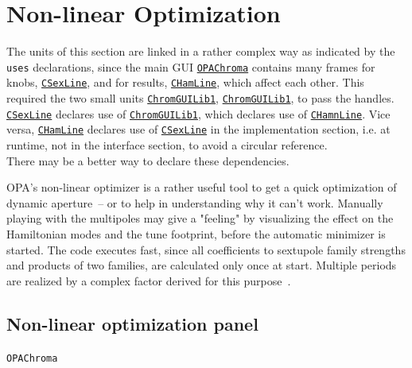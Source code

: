 \documentclass[12pt]{article}
\newcommand\code[1]{{\tt #1}}
\newcommand{\opagui}[1]{\colorbox{blue!20}{\code{#1}}}
\newcommand{\oguih}[2]{\subsection{\label{#2}#1}{\Huge\opagui{#2}}\\}
\newcommand{\ogui}[1]{\hyperref[#1]{\opagui{#1}}}
\newcommand{\opaguif}[1]{\colorbox{violet!30}{\code{#1}}}
\newcommand{\oguif}[1]{\hyperref[#1]{\opaguif{#1}}}
\newcommand{\opauni}[1]{\colorbox{orange!30}{\code{#1}}}
\newcommand{\ouni}[1]{\hyperref[#1]{\opauni{#1}}}
\newcommand{\todo}[1]{{\color{red} #1}}
\newcommand{\feature}[1]{{\color{cadmiumgreen} #1}}
\begin{document}
\section{\label{secnonl}Non-linear Optimization}

The units of this section are linked in a rather complex way as indicated by the \code{uses} declarations, since the main GUI \ogui{OPAChroma} contains many frames for knobs, \oguif{CSexLine}, and for results, \oguif{CHamLine}, which affect each other. This required the two small units \ouni{ChromGUILib1}, \ouni{ChromGUILib1}, to pass the handles. \oguif{CSexLine} declares use of \ouni{ChromGUILib1}, which declares use of \oguif{CHamnLine}. Vice versa,
\oguif{CHamLine} declares use of \oguif{CSexLine} in the implementation section, i.e. at runtime, not in the interface section, to avoid a circular reference. \\
\todo{There may be a better way to declare these dependencies.}

\feature{OPA's non-linear optimizer is a rather useful tool to get a quick optimization of dynamic aperture~-- or to help in understanding why it can't work. Manually playing with the multipoles may give a "feeling" by visualizing the effect on the Hamiltonian modes and the tune footprint, before the automatic minimizer is started. The code executes fast, since all coefficients to sextupole family strengths and products of two families, are calculated only once at start. Multiple periods are realized by a complex factor derived for this purpose~\cite{inside}.}

\oguih{Non-linear optimization panel}{OPAChroma} 
\end{document}
